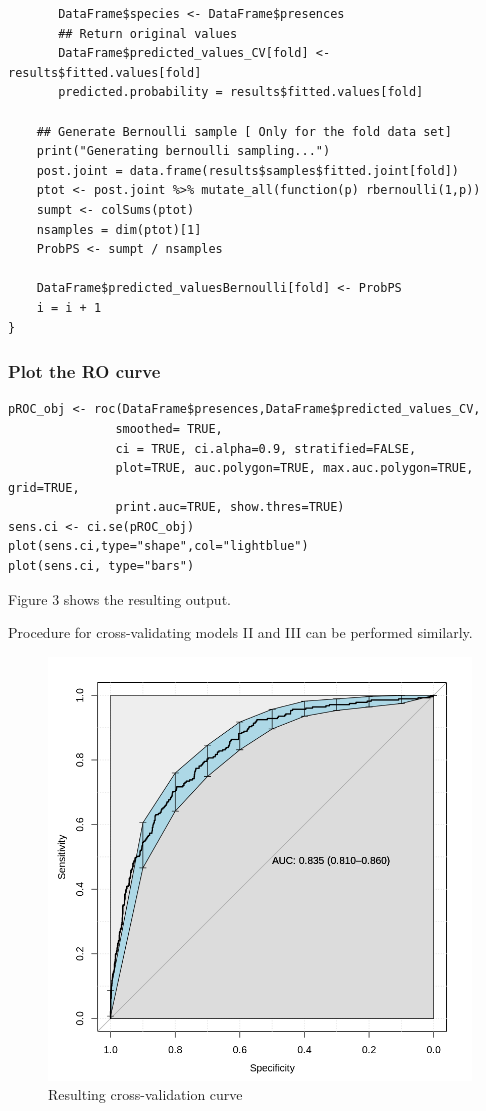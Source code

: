 \documentclass[11pt]{article}
\begin{document}
\begin{enumerate}
\begin{verbatim}
       DataFrame$species <- DataFrame$presences
       ## Return original values
       DataFrame$predicted_values_CV[fold] <- results$fitted.values[fold]
       predicted.probability = results$fitted.values[fold]

    ## Generate Bernoulli sample [ Only for the fold data set]
    print("Generating bernoulli sampling...")
    post.joint = data.frame(results$samples$fitted.joint[fold])
    ptot <- post.joint %>% mutate_all(function(p) rbernoulli(1,p))
    sumpt <- colSums(ptot)
    nsamples = dim(ptot)[1]
    ProbPS <- sumpt / nsamples

    DataFrame$predicted_valuesBernoulli[fold] <- ProbPS
    i = i + 1
}
\end{verbatim}
\end{enumerate}

\subsubsection{Plot the RO curve}
\label{sec:org19afc88}
\begin{verbatim}
pROC_obj <- roc(DataFrame$presences,DataFrame$predicted_values_CV,
               smoothed= TRUE,
               ci = TRUE, ci.alpha=0.9, stratified=FALSE,
               plot=TRUE, auc.polygon=TRUE, max.auc.polygon=TRUE, grid=TRUE,
               print.auc=TRUE, show.thres=TRUE)
sens.ci <- ci.se(pROC_obj)
plot(sens.ci,type="shape",col="lightblue")
plot(sens.ci, type="bars")
\end{verbatim}

Figure 3 shows the resulting output.

Procedure for cross-validating models II and III can be performed similarly.

\begin{figure}[htbp]
\centering
\includegraphics[width=.9\linewidth]{./rocmodel1wNA.png}
\caption{Resulting cross-validation curve}
\end{figure}
\end{document}

